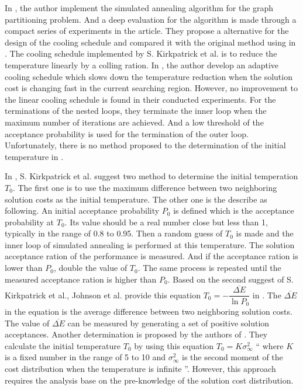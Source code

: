 In \cite{doi:10.1287/opre.37.6.865}, the author implement the simulated 
annealing algorithm for the graph partitioning problem.
And a deep evaluation for the algorithm is made through a compact series
of experiments in the article.
They propose a alternative for the design of the cooling schedule and 
compared it with the original method using in \cite{10.2307/1690046}.
The cooling schedule implemented by S. Kirkpatrick et al. is to reduce
the temperature linearly by a colling ration.
In \cite{doi:10.1287/opre.37.6.865}, the author develop an adaptive
cooling schedule which slows down the temperature reduction when the solution
cost is changing fast in the current searching region. However, no improvement
to the linear cooling schedule is found in their conducted experiments.
For the terminations of the nested loops, they terminate the inner loop when
the maximum number of iterations are achieved. And a low threshold of the
acceptance probability is used for the termination of the outer loop.
Unfortunately, there is no method proposed to the determination of the initial
temperature in \cite{doi:10.1287/opre.37.6.865}.

In \cite{10.2307/1690046}, S. Kirkpatrick et al. suggest two method to determine
the initial temperation $T_{0}$. The first one is to use the maximum difference
between two neighboring solution costs as the initial temperature. The other one
is the describe as following. An initial acceptance probability $P_{0}$ is defined
which is the acceptance probability at $T_{0}$.
Its value should be a real number close but less than 1, typically in the range of
0.8 to 0.95.
Then a random guess of $T_{0}$ is made and the inner loop of
simulated annealing is performed at this temperature. The solution
acceptance ration of the performance is measured. And if the
acceptance ration is lower than $P_{0}$, double the value of
$T_{0}$. The same process is repeated until the measured acceptance
ration is higher than $P_{0}$.
Based on the second suggest of S. Kirkpatrick et al., Johnson et al.
provide this equation
$T_{0}= - \dfrac{\overline{\Delta E}}{\ln P_{0}}$
in \cite{Johnson:1991:OSA:108188.108193}.
The $\overline{\Delta E}$ in the equation is the average difference 
between two neighboring solution costs. The value of
$\overline{\Delta E}$ can be measured by generating a set of positive
solution acceptances.
Another determination is proposed
by the authors of \cite{white1984concepts}.
They calculate the initial temperature $T_{0}$ by using this equation
$T_{0} = K \sigma^{2}_{\infty}$
\textquotedblleft
where $K$ is a fixed number in the range of 5 to 10 and
$\sigma^{2}_{\infty}$ is the second moment of the cost distribution 
when the temperature is infinite
\textquotedblright \cite{Ben-Ameur2004}.
However, this approach requires the analysis base on the pre-knowledge
of the solution cost distribution.